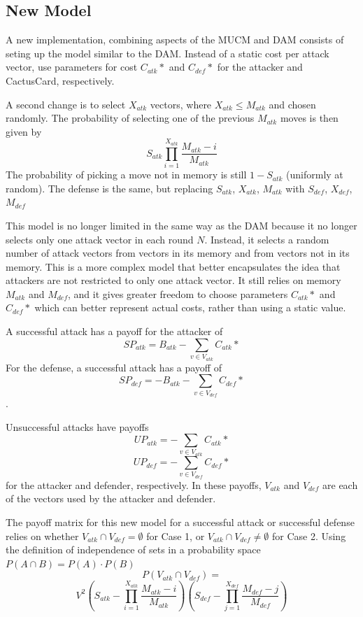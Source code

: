\documentclass[11pt,journal]{IEEEtran}
\begin{document}
\subsection{New Model}
A new implementation, combining aspects of the MUCM and DAM consists of seting up the model similar to the DAM. Instead of a static cost per attack vector, use parameters for cost $C_{atk}{*}$ and $C_{def}{*}$ for the attacker and CactusCard, respectively.
\par
A second change is to select $X_{atk}$ vectors, where $X_{atk} \leq M_{atk}$ and chosen randomly. The probability of selecting one of the previous $M_{atk}$ moves is then given by
\[S_{atk} \prod_{i=1}^{X_{atk}} \frac{M_{atk}-i}{M_{atk}}\]
The probability of picking a move not in memory is still $1-S_{atk}$ (uniformly at random). The defense is the same, but replacing $S_{atk}$, $X_{atk}$, $M_{atk}$ with $S_{def}$, $X_{def}$, $M_{def}$
\par
This model is no longer limited in the same way as the DAM because it no longer selects only one attack vector in each round $N$. Instead, it selects a random number of attack vectors from vectors in its memory and from vectors not in its memory. This is a more complex model that better encapsulates the idea that attackers are not restricted to only one attack vector. It still relies on memory $M_{atk}$ and $M_{def}$, and it gives greater freedom to choose parameters $C_{atk}*$ and $C_{def}*$ which can better represent actual costs, rather than using a static value.
\par
A successful attack has a payoff for the attacker of \[SP_{atk} = B_{atk} -\sum_{v \in V_{atk}} C_{atk}*\]
For the defense, a successful attack has a payoff of \[SP_{def} = -B_{atk} -\sum_{v \in V_{def}} C_{def}*\].
\par
Unsuccessful attacks have payoffs \[UP_{atk} = -\sum_{v \in V_{atk}} C_{atk}*\] \[UP_{def} = -\sum_{v \in V_{def}} C_{def}*\] for the attacker and defender, respectively. In these payoffs, $V_{atk}$ and $V_{def}$ are each of the vectors used by the attacker and defender.
\par
The payoff matrix for this new model for a successful attack or successful defense relies on whether $V_{atk} \cap V_{def} = \emptyset$ for Case 1, or $V_{atk} \cap V_{def} \neq \emptyset$ for Case 2. Using the definition of independence of sets in a probability space $P(A \cap B) = P(A)\cdot P(B)$
\[P( V_{atk} \cap V_{def}) =\]
\[ V^2 ( S_{atk} - \prod_{i=1}^{X_{atk}} \frac{M_{atk}-i}{M_{atk}}) ( S_{def} - \prod_{j=1}^{X_{def}} \frac{M_{def}-j}{M_{def}}) \]
\end{document}
